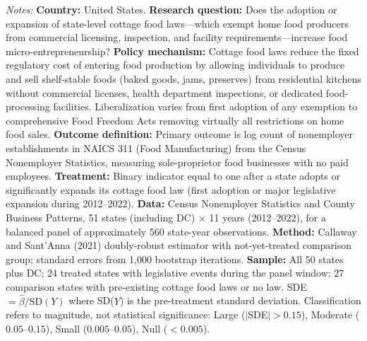 \begin{table}[htbp]
\begin{tablenotes}[flushleft]
\item \textit{Notes:} \textbf{Country:} United States. \textbf{Research question:} Does the adoption or expansion of state-level cottage food laws---which exempt home food producers from commercial licensing, inspection, and facility requirements---increase food micro-entrepreneurship? \textbf{Policy mechanism:} Cottage food laws reduce the fixed regulatory cost of entering food production by allowing individuals to produce and sell shelf-stable foods (baked goods, jams, preserves) from residential kitchens without commercial licenses, health department inspections, or dedicated food-processing facilities. Liberalization varies from first adoption of any exemption to comprehensive Food Freedom Acts removing virtually all restrictions on home food sales. \textbf{Outcome definition:} Primary outcome is log count of nonemployer establishments in NAICS 311 (Food Manufacturing) from the Census Nonemployer Statistics, measuring sole-proprietor food businesses with no paid employees. \textbf{Treatment:} Binary indicator equal to one after a state adopts or significantly expands its cottage food law (first adoption or major legislative expansion during 2012--2022). \textbf{Data:} Census Nonemployer Statistics and County Business Patterns, 51 states (including DC) $\times$ 11 years (2012--2022), for a balanced panel of approximately 560 state-year observations. \textbf{Method:} Callaway and Sant'Anna (2021) doubly-robust estimator with not-yet-treated comparison group; standard errors from 1,000 bootstrap iterations. \textbf{Sample:} All 50 states plus DC; 24 treated states with legislative events during the panel window; 27 comparison states with pre-existing cottage food laws or no law. SDE $= \hat{\beta} / \text{SD}(Y)$ where SD($Y$) is the pre-treatment standard deviation. Classification refers to magnitude, not statistical significance: Large ($|$SDE$| > 0.15$), Moderate ($0.05$--$0.15$), Small ($0.005$--$0.05$), Null ($< 0.005$). 
\end{tablenotes}
\end{table}
